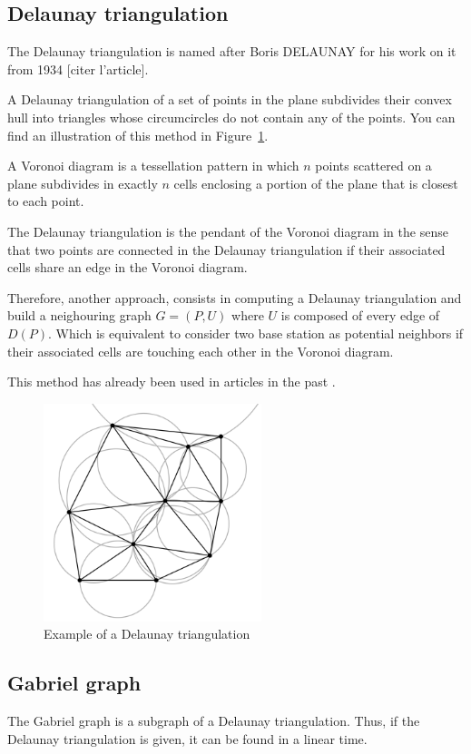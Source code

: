 \documentclass[lettersize,journal,english]{IEEEtran}
\begin{document}
\subsection{Delaunay triangulation}
\noindent The Delaunay triangulation is named after Boris DELAUNAY for his work on it from 1934 [citer l'article].

A Delaunay triangulation of a set of points in the plane subdivides their convex hull into triangles whose circumcircles 
do not contain any of the points. You can find an illustration of this method in Figure~\ref{del_tri}.

A Voronoi diagram is a tessellation pattern in which $n$ points scattered on a plane subdivides in 
exactly $n$ cells enclosing a portion of the plane that is closest to each point. 

The Delaunay triangulation is the pendant of the Voronoi diagram in the sense that two points are connected in the
Delaunay triangulation if their associated cells share an edge in the Voronoi diagram. 

Therefore, another approach, consists in computing a Delaunay triangulation and build a neighouring graph $G = (P, U)$ where $U$ 
is composed of every edge of $D(P)$. Which is equivalent to consider two base station as potential neighbors if their associated
cells are touching each other in the Voronoi diagram.

This method has already been used in articles in the past \cite{delaunay_neighbor}.


\begin{figure}[!t]
    \centering
    \includegraphics[width=2.5in]{images/illus_graphs/Delaunay_circumcircles_vectorial.svg.png}
    \caption{Example of a Delaunay triangulation}
    \label{del_tri}
\end{figure}

\subsection{Gabriel graph}
\noindent The Gabriel graph is a subgraph of a Delaunay triangulation. Thus, if the Delaunay triangulation is given, it can be found in a linear time. 
\end{document}
